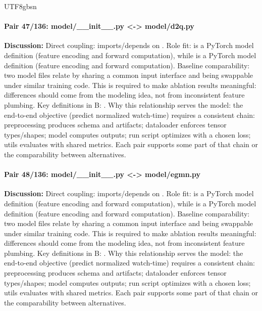 \documentclass[11pt]{article}
\begin{document}
\begin{CJK*}{UTF8}{gbsn}
\paragraph{Pair 47/136: model/\_\_init\_\_.py <-> model/d2q.py}
\textbf{Discussion:} Direct coupling: \texttt{} imports/depends on \texttt{}. Role fit: \texttt{} is a PyTorch model definition (feature encoding and forward computation), while \texttt{} is a PyTorch model definition (feature encoding and forward computation). Baseline comparability: two model files relate by sharing a common input interface and being swappable under similar training code. This is required to make ablation results meaningful: differences should come from the modeling idea, not from inconsistent feature plumbing. Key definitions in B: \texttt{}. Why this relationship serves the model: the end-to-end objective (predict normalized watch-time) requires a consistent chain: preprocessing produces schema and artifacts; dataloader enforces tensor types/shapes; model computes outputs; run script optimizes with a chosen loss; utils evaluates with shared metrics. Each pair supports some part of that chain or the comparability between alternatives.

\paragraph{Pair 48/136: model/\_\_init\_\_.py <-> model/egmn.py}
\textbf{Discussion:} Direct coupling: \texttt{} imports/depends on \texttt{}. Role fit: \texttt{} is a PyTorch model definition (feature encoding and forward computation), while \texttt{} is a PyTorch model definition (feature encoding and forward computation). Baseline comparability: two model files relate by sharing a common input interface and being swappable under similar training code. This is required to make ablation results meaningful: differences should come from the modeling idea, not from inconsistent feature plumbing. Key definitions in B: \texttt{}. Why this relationship serves the model: the end-to-end objective (predict normalized watch-time) requires a consistent chain: preprocessing produces schema and artifacts; dataloader enforces tensor types/shapes; model computes outputs; run script optimizes with a chosen loss; utils evaluates with shared metrics. Each pair supports some part of that chain or the comparability between alternatives.


\end{CJK*}
\end{document}

